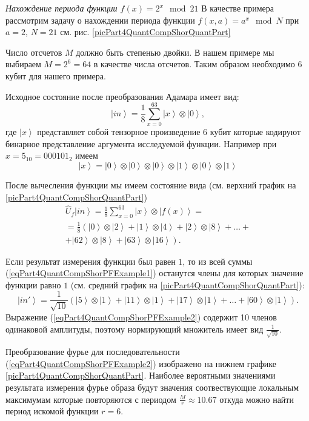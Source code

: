 \begin{example}
\emph{Нахождение периода функции $f\left(x\right) = 2^x \mod 21$}
\label{exPart4QuantCompShorQuantPeriodFinding}
В качестве примера рассмотрим задачу о нахождении периода функции 
$f\left(x, a\right) = a^x \mod{N}$ при $a=2$, $N = 21$ см. рис. 
\ref{picPart4QuantCompShorQuantPart}

Число отсчетов  $M$ должно быть степенью двойки. В нашем примере мы
выбираем $M = 2^6 = 64$ в качестве числа отсчетов. Таким образом
необходимо 6 кубит для нашего примера.

Исходное состояние после  преобразования Адамара имеет вид:
\begin{equation}
\left|in\right> = \frac{1}{8}\sum_{x = 0}^{63}\left|x\right> \otimes \left|0\right>,
\nonumber
\end{equation}
где $\left|x\right>$ представляет собой тензорное произведение 6 кубит
которые кодируют бинарное представление аргумента исследуемой
функции. Например при $x=5_{10}=000101_2$ имеем
\[
\left|x\right> = \left|0\right>\otimes \left|0\right>\otimes
\left|0\right>\otimes 
\left|1\right>\otimes \left|0\right>\otimes \left|1\right>
\]

После вычесления функции мы имеем состояние вида (см. верхний график
на \autoref{picPart4QuantCompShorQuantPart})
\begin{eqnarray}
\hat{U}_f\left|in\right> = \frac{1}{8}\sum_{x = 0}^{63}\left|x\right>
\otimes \left|f\left(x\right)\right> = 
\nonumber \\
=
\frac{1}{8}
\left(
\left|0\right>\otimes\left|2\right> + 
\left|1\right>\otimes\left|4\right> + 
\left|2\right>\otimes\left|8\right> + \dots +
\right.
\nonumber \\
\left.
+
\left|62\right>\otimes\left|8\right> +
\left|63\right>\otimes\left|16\right>
\right).
\label{eqPart4QuantCompShorPFExample1}
\end{eqnarray}

Если результат измерения функции был равен $1$, то из всей суммы
(\ref{eqPart4QuantCompShorPFExample1}) останутся члены для которых
значение функции равно $1$ (см. средний график
на \autoref{picPart4QuantCompShorQuantPart}):
\begin{equation}
\left|in'\right> = \frac{1}{\sqrt{10}}\left( 
\left|5\right>\otimes\left|1\right> +
\left|11\right>\otimes\left|1\right> +
\left|17\right>\otimes\left|1\right> +
\dots +
\left|60\right>\otimes\left|1\right>
\right).
\label{eqPart4QuantCompShorPFExample2}
\end{equation} 
Выражение (\ref{eqPart4QuantCompShorPFExample2}) содержит 10 членов
одинаковой амплитуды, поэтому нормирующий множитель имеет вид
$\frac{1}{\sqrt{10}}$.

Преобразование фурье для последовательности
(\ref{eqPart4QuantCompShorPFExample2}) изображено на нижнем графике
\autoref{picPart4QuantCompShorQuantPart}. Наиболее вероятными
значениями результата измерения фурье образа будут значения
соотвествующие локальным максимумам которые повторяются с периодом 
$\frac{M}{r}\approx10.67$ откуда можно найти период искомой функции
$r=6$. 

\end{example}
